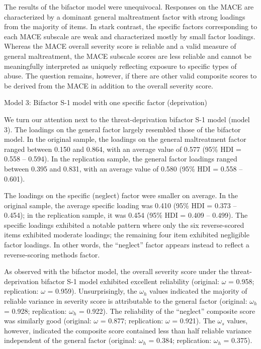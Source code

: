 \documentclass[letterpaper,man,natbib]{apa6}  %
\makeatletter
\renewcommand{\subsubsection}{\@startsection{subsubsection}{3}
  {\z@}%
  {\b@level@two@skip}{\e@level@two@skip}%
  {\normalfont\normalsize\bfseries}}
\makeatother
\begin{document}
The results of the bifactor model were unequivocal. Responses on the MACE are characterized by a dominant general maltreatment factor with strong loadings from the majority of items. In stark contrast, the specific factors corresponding to each MACE subscale are weak and characterized mostly by small factor loadings. Whereas the MACE overall severity score is reliable and a valid measure of general maltreatment, the MACE subscale scores are less reliable and cannot be meaningfully interpreted as uniquely reflecting exposure to specific types of abuse. The question remains, however, if there are other valid composite scores to be derived from the MACE in addition to the overall severity score.

\subsubsection{Model 3: Bifactor S-1 model with one specific factor (deprivation)}

We turn our attention next to the threat-deprivation bifactor S-1 model (model 3). The loadings on the general factor largely resembled those of the bifactor model. In the original sample, the loadings on the general maltreatment factor ranged between 0.150 and 0.864, with an average value of 0.577 (95\% HDI = 0.558 -- 0.594). In the replication sample, the general factor loadings ranged between 0.395 and 0.831, with an average value of 0.580 (95\% HDI = 0.558 -- 0.601). 

The loadings on the specific (neglect) factor were smaller on average. In the original sample, the average specific loading was 0.410 (95\% HDI = 0.373 -- 0.454); in the replication sample, it was 0.454 (95\% HDI = 0.409 -- 0.499). The specific loadings exhibited a notable pattern where only the six reverse-scored items exhibited moderate loadings; the remaining four item exhibited negligible factor loadings. In other words, the ``neglect'' factor appears instead to reflect a reverse-scoring methods factor.

As observed with the bifactor model, the overall severity score under the threat- deprivation bifactor S-1 model exhibited excellent reliability (original: $\omega$ = 0.958; replication: $\omega$ = 0.959). Unsurprisingly, the $\omega_h$ values indicated the majority of reliable variance in severity score is attributable to the general factor (original: $\omega_h$ = 0.928; replication: $\omega_h$ = 0.922). The reliability of the ``neglect'' composite score was similarly good (original: $\omega$ = 0.877; replication: $\omega$ = 0.921). The $\omega_s$ values, however, indicated the composite score contained less than half reliable variance independent of the general factor (original: $\omega_h$ = 0.384; replication: $\omega_h$ = 0.375). 
\end{document}
